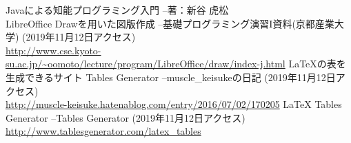 \documentclass[uplatex,12pt]{jsarticle}
\begin{document}
\begin{thebibliography}{99}
 Javaによる知能プログラミング入門 --著：新谷 虎松 \\
 LibreOffice Drawを用いた図版作成 --基礎プログラミング演習I資料(京都産業大学) (2019年11月12日アクセス)\\
\url{http://www.cse.kyoto-su.ac.jp/~oomoto/lecture/program/LibreOffice/draw/index-j.html} 
 LaTeXの表を生成できるサイト Tables Generator --muscle\_keisukeの日記 (2019年11月12日アクセス)\\
\url{http://muscle-keisuke.hatenablog.com/entry/2016/07/02/170205} 
 LaTeX Tables Generator --Tables Generator (2019年11月12日アクセス)\\
\url{http://www.tablesgenerator.com/latex_tables} \\
\end{thebibliography}
\end{document}
